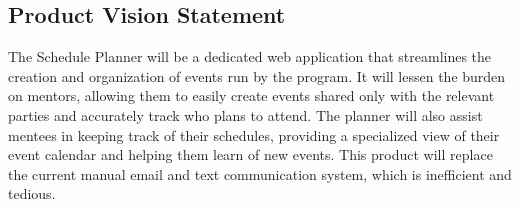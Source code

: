 \subsection{Product Vision Statement}
The {\ClientName} Schedule Planner will be a dedicated web application that
streamlines the creation and organization of events run by the program. It will
lessen the burden on mentors, allowing them to easily create events shared only
with the relevant parties and accurately track who plans to attend. The planner
will also assist mentees in keeping track of their schedules, providing a
specialized view of their event calendar and helping them learn of new events.
This product will replace the current manual email and text communication
system, which is inefficient and tedious.
